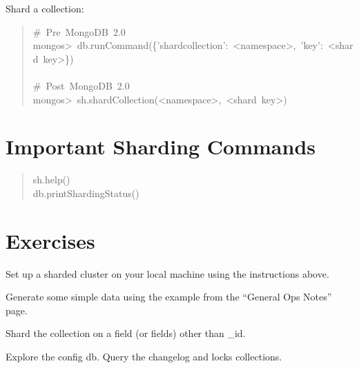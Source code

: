 \documentclass[letter]{article}
\begin{document}
Shard a collection:
%
\begin{quote}{\ttfamily \raggedright \noindent
\#~Pre~MongoDB~2.0\\
mongos>~db.runCommand(\{'shardcollection':~<namespace>,~'key':~<shard~key>\})\\
~\\
\#~Post~MongoDB~2.0\\
mongos>~sh.shardCollection(<namespace>,~<shard~key>)
}
\end{quote}


\section{Important Sharding Commands%
  \label{important-sharding-commands}%
}
%
\begin{quote}{\ttfamily \raggedright \noindent
sh.help()\\
db.printShardingStatus()
}
\end{quote}


\section{Exercises%
  \label{exercises}%
}
\begin{list}{.}
{
\setlength{\rightmargin}{\leftmargin}
}

\item Set up a sharded cluster on your local machine using the instructions above.

\item Generate some simple data using the example from the ``General Ops Notes'' page.

\item Shard the collection on a field (or fields) other than \_id.

\item Explore the config db. Query the changelog and locks collections.
\end{list}
\end{document}
